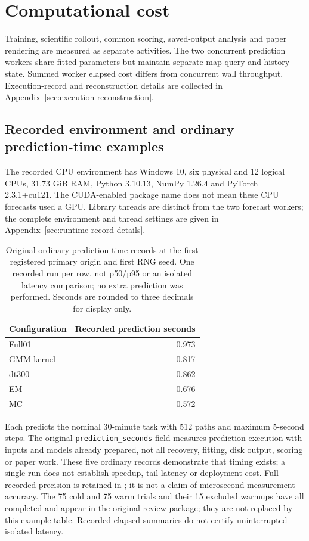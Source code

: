 \documentclass[11pt]{article}
\begin{document}
\clearpage
\section{Computational cost}
Training, scientific rollout, common scoring, saved-output analysis and paper
rendering are measured as separate activities. The two concurrent prediction
workers share fitted parameters but maintain separate map-query and history
state. Summed worker elapsed cost differs from concurrent wall throughput.
Execution-record and reconstruction details are collected in
Appendix~\ref{sec:execution-reconstruction}.

\subsection{Recorded environment and ordinary prediction-time examples}
\label{sec:preliminary-cost}
The recorded CPU environment has Windows 10, six physical and
12 logical CPUs, 31.73 GiB RAM, Python 3.10.13, NumPy 1.26.4 and PyTorch
2.3.1+cu121. The CUDA-enabled package name does not mean these CPU forecasts
used a GPU. Library threads are distinct from the two forecast workers;
the complete environment and thread settings are given in
Appendix~\ref{sec:runtime-record-details}.

\begin{table}[htbp]
\centering\small
\caption{Original ordinary prediction-time records at the first registered
primary origin and first RNG seed. One recorded run per row, not p50/p95
or an isolated latency comparison; no extra prediction was performed.
Seconds are rounded to three decimals for display only.}
\label{tab:preliminary-cost}
\begin{tabular}{@{}lr@{}}
\toprule
Configuration & Recorded prediction seconds\\
\midrule
Full01 & 0.973\\
GMM kernel & 0.817\\
dt300 & 0.862\\
EM & 0.676\\
MC & 0.572\\
\bottomrule
\end{tabular}
\end{table}
Each predicts the nominal 30-minute task with 512 paths and maximum 5-second
steps. The original \texttt{prediction\_seconds} field measures prediction
execution with inputs and models already prepared, not all recovery,
fitting, disk output, scoring or paper work. These five ordinary records
demonstrate that timing exists; a single run does not establish speedup,
tail latency or deployment cost. Full recorded precision is retained in
; it is not a claim
of microsecond measurement accuracy. The 75 cold and 75 warm trials and their
15 excluded warmups have all completed and appear in the original review
package; they are not replaced by this example table. Recorded elapsed
summaries do not certify uninterrupted isolated latency.
\end{document}
